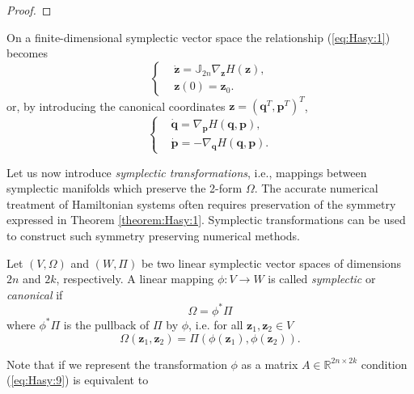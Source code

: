 \documentclass[final]{siamart}
\begin{document}
{\begin{proof}
\end{proof}
\begin{theorem} \label{theorem:Hasy:1.7} \cite{Marsden:1999ck}
On a finite-dimensional symplectic vector space the relationship (\ref{eq:Hasy:1}) becomes 
\begin{equation} \label{eq:Hasy:7}
\left\{
\begin{aligned}
	&\dot {\mathbf z} = \mathbb{J}_{2n} \nabla_{\mathbf z} H(\mathbf z), \\
	& \mathbf z(0) = \mathbf z_0.
\end{aligned}
\right.
\end{equation}
or, by introducing the canonical coordinates $\mathbf z = (\mathbf q^T, \mathbf p^T)^T$,
\begin{equation} \label{eq:Hasy:8}
\left\{
\begin{aligned}
	&\dot {\mathbf q} = \nabla_{\mathbf p} H(\mathbf q,\mathbf p),\\
	&\dot {\mathbf p} = - \nabla_{\mathbf q} H(\mathbf q,\mathbf p).
\end{aligned}
\right.
\end{equation}
\end{theorem}
}

{{\color{black}} Let} us now introduce \emph{symplectic transformations}, i.e., mappings between symplectic manifolds which preserve the 2-form $\Omega$. The accurate numerical treatment of Hamiltonian systems often requires preservation of the symmetry expressed in Theorem \ref{theorem:Hasy:1}. Symplectic transformations can be used to construct such symmetry preserving numerical methods. 

{{\color{black}}
\begin{definition}
Let $(V,\Omega)$ and $(W,\Pi)$ be two linear symplectic vector spaces of dimensions $2n$ and $2k$, respectively. A linear mapping $\phi:V \to W$ is called \emph{symplectic} or \emph{canonical} if
\begin{equation} \label{eq:Hasy:9}
	\Omega = \phi^* \Pi
\end{equation}
where $\phi^* \Pi$ is the pullback of $\Pi$ by $\phi$, i.e. for all $\mathbf{z}_1, \mathbf{z}_2\in V$
\begin{equation}
	\Omega(\mathbf{z}_1,\mathbf{z}_2) = \Pi(\phi(\mathbf{z}_1),\phi(\mathbf{z}_2)).
\end{equation}
\end{definition}

Note that if we represent the transformation $\phi$ as a matrix $A\in \mathbb R^{2n\times 2k}$ condition (\ref{eq:Hasy:9}) is equivalent to \cite{Marsden:1999ck}}
\end{document}
